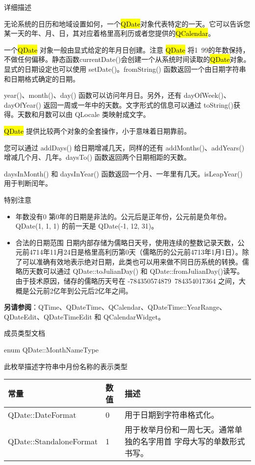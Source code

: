 详细描述

无论系统的日历和地域设置如何，一个\hl{QDate}对象代表特定的一天。它可以告诉您某一天的年、月、日，其对应着格里高利历或者您提供的\hl{QCalendar}。

一个\hl{QDate} 对象一般由显式给定的年月日创建。注意 \hl{QDate} 将1~99的年数保持，不做任何偏移。静态函数currentDate()会创建一个从系统时间读取的\hl{QDate}对象。显式的日期设定也可以使用 setDate()。fromString() 函数返回一个由日期字符串和日期格式确定的日期。

year()、month()、day() 函数可以访问年月日。另外，还有 dayOfWeek()、dayOfYear() 返回一周或一年中的天数。文字形式的信息可以通过 toString()获得。天数和月数可以由 QLocale 类映射成文字。

\hl{QDate} 提供比较两个对象的全套操作，小于意味着日期靠前。

您可以通过 addDays() 给日期增减几天，同样的还有 addMonths()、addYears() 增减几个月、几年。daysTo() 函数返回两个日期相距的天数。

daysInMonth() 和 daysInYear() 函数返回一个月、一年里有几天。isLeapYear() 用于判断闰年。

特别注意

\begin{itemize}
\item 年数没有0 第0年的日期是非法的。公元后是正年份，公元前是负年份。QDate(1, 1, 1) 的前一天是 QDate(-1, 12, 31)。
\item 合法的日期范围 日期内部存储为儒略日天号，使用连续的整数记录天数，公元前4714年11月24日是格里高利历第0天（儒略历的公元前4713年1月1日）。除了可以准确有效地表示绝对日期，此类也可以用来做不同日历系统的转换。儒略历天数可以通过 QDate::toJulianDay() 和 QDate::fromJulianDay()读写。 由于技术原因，储存的儒略历天号在 -784350574879~784354017364 之间，大概是公元前2亿年到公元后2亿年之间。
\end{itemize}

\textbf{另请参阅}：QTime、QDateTime、QCalendar、QDateTime::YearRange、QDateEdit、QDateTimeEdit 和 QCalendarWidget。

\splitLine

成员类型文档

enum QDate::MonthNameType

此枚举描述字符串中月份名称的表示类型

\begin{tabular}{|l|l|m{20em}|}
\hline
常量	&数值&	描述\\
\hline
QDate::DateFormat&	0&	用于日期到字符串格式化。\\
\hline
QDate::StandaloneFormat	&1&	用于枚举月份和一周七天。通常单独的名字用首
  字母大写的单数形式书写。\\
\hline
\end{tabular}

